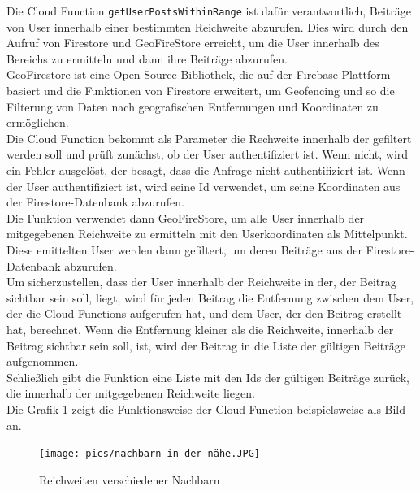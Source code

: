 Die Cloud Function \texttt{getUserPostsWithinRange} ist dafür verantwortlich, Beiträge von User innerhalb einer bestimmten Reichweite abzurufen. Dies wird durch den Aufruf von Firestore und GeoFireStore erreicht, um die User innerhalb des Bereichs zu ermitteln und dann ihre Beiträge abzurufen.
\\
GeoFirestore\cite{geofirestore} ist eine Open-Source-Bibliothek, die auf der Firebase-Plattform basiert und die Funktionen von Firestore erweitert, um Geofencing und so die Filterung von Daten nach geografischen Entfernungen und Koordinaten zu ermöglichen.
\\
Die Cloud Function bekommt als Parameter die Rechweite innerhalb der gefiltert werden soll und prüft zunächst, ob der User authentifiziert ist. Wenn nicht, wird ein Fehler ausgelöst, der besagt, dass die Anfrage nicht authentifiziert ist. Wenn der User authentifiziert ist, wird seine Id verwendet, um seine Koordinaten aus der Firestore-Datenbank abzurufen.
\\
Die Funktion verwendet dann GeoFireStore, um alle User innerhalb der mitgegebenen Reichweite zu ermitteln mit den Userkoordinaten als Mittelpunkt. Diese emittelten User werden dann gefiltert, um deren Beiträge aus der Firestore-Datenbank abzurufen.
\\
Um sicherzustellen, dass der User innerhalb der Reichweite in der, der Beitrag sichtbar sein soll, liegt, wird für jeden Beitrag die Entfernung zwischen dem User, der die Cloud Functions aufgerufen hat, und dem User, der den Beitrag erstellt hat, berechnet. Wenn die Entfernung kleiner als die Reichweite, innerhalb der Beitrag sichtbar sein soll, ist, wird der Beitrag in die Liste der gültigen Beiträge aufgenommen.
\\
Schließlich gibt die Funktion eine Liste mit den Ids der gültigen Beiträge zurück, die innerhalb der mitgegebenen Reichweite liegen.
\\
Die Grafik \ref{fig:near-neighbours} zeigt die Funktionsweise der Cloud Function beispielsweise als Bild an.

\begin{figure}[H]
  \centering
  \texttt{[image: pics/nachbarn-in-der-nähe.JPG]}
  \caption{Reichweiten verschiedener Nachbarn}
  \label{fig:near-neighbours}
\end{figure}

